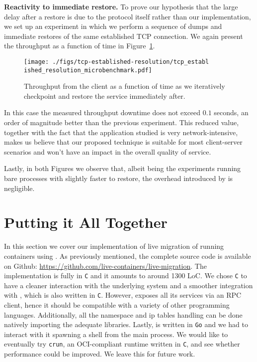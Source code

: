 \textbf{Reactivity to immediate restore.}
To prove our hypothesis that the large delay after a restore is due to the
protocol itself rather than our implementation, we set up an experiment in
which we perform a sequence of dumps and immediate restores of the same
established TCP connection.
We again present the throughput as a function of time in
Figure~\ref{fig:evaluation-reactivity}.
\begin{figure}[h!]
    \centering

    \texttt{[image: ./figs/tcp-established-resolution/tcp\_establ
        ished\_resolution\_microbenchmark.pdf]}
    \caption[Throughput over time and reactivity to sudden C/R.]{Throughput
        from the client as a function of time as we iteratively checkpoint and
        restore
        the service immediately after.\label{fig:evaluation-reactivity}}
\end{figure}
In this case the measured throughput downtime does not exceed $0.1$ seconds, an
order of magnitude better than the previous experiment.
This reduced value, together with the fact that the application studied is very
network-intensive, makes us believe that our proposed technique is suitable for
most client-server scenarios and won't have an impact in the overall quality of
service.

Lastly, in both Figures we observe that, albeit being the experiments running
bare processes with \criu slightly faster to restore, the overhead introduced
by \runc is negligible.

\section{Putting it All Together} \label{sec:system}

In this section we cover our implementation of live migration of running \runc
containers using \criu.
As previously mentioned, the complete source code is available on Github:
\url{https://github.com/live-containers/live-migration}.
The implementation is fully in \texttt{C} and it amounts to around 1300 LoC.
We chose \texttt{C} to have a cleaner interaction with the underlying system
and a smoother integration with \criu, which is also written in \texttt{C}.
However, \criu exposes all its services via an RPC client, hence it should be
compatible with a variety of other programming languages.
Additionally, all the namespace and ip tables handling can be done natively
importing the adequate libraries.
Lastly, \runc is written in \texttt{Go} and we had to interact with it spawning
a shell from the main process.
We would like to eventually try \texttt{crun}, an OCI-compliant runtime written
in \texttt{C}, and see whether performance could be improved.
We leave this for future work.

